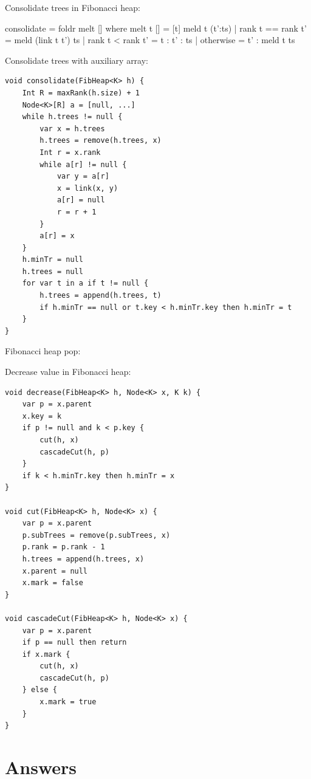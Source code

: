 \documentclass[b5paper]{article}
\begin{document}
Consolidate trees in Fibonacci heap:

\begin{Haskell}
consolidate = foldr melt [] where
    melt t [] = [t]
    meld t (t':ts) | rank t == rank t' = meld (link t t') ts
                   | rank t <  rank t' = t : t' : ts
                   | otherwise = t' : meld t ts
\end{Haskell}

Consolidate trees with auxiliary array:

\begin{lstlisting}[language = Bourbaki]
void consolidate(FibHeap<K> h) {
    Int R = maxRank(h.size) + 1
    Node<K>[R] a = [null, ...]
    while h.trees != null {
        var x = h.trees
        h.trees = remove(h.trees, x)
        Int r = x.rank
        while a[r] != null {
            var y = a[r]
            x = link(x, y)
            a[r] = null
            r = r + 1
        }
        a[r] = x
    }
    h.minTr = null
    h.trees = null
    for var t in a if t != null {
        h.trees = append(h.trees, t)
        if h.minTr == null or t.key < h.minTr.key then h.minTr = t
    }
}
\end{lstlisting}

Fibonacci heap pop:


Decrease value in Fibonacci heap:

\begin{lstlisting}[language = Bourbaki]
void decrease(FibHeap<K> h, Node<K> x, K k) {
    var p = x.parent
    x.key = k
    if p != null and k < p.key {
        cut(h, x)
        cascadeCut(h, p)
    }
    if k < h.minTr.key then h.minTr = x
}

void cut(FibHeap<K> h, Node<K> x) {
    var p = x.parent
    p.subTrees = remove(p.subTrees, x)
    p.rank = p.rank - 1
    h.trees = append(h.trees, x)
    x.parent = null
    x.mark = false
}

void cascadeCut(FibHeap<K> h, Node<K> x) {
    var p = x.parent
    if p == null then return
    if x.mark {
        cut(h, x)
        cascadeCut(h, p)
    } else {
        x.mark = true
    }
}
\end{lstlisting}

\ifx\wholebook\relax \else
\section{Answers}
\shipoutAnswer
\end{document}
